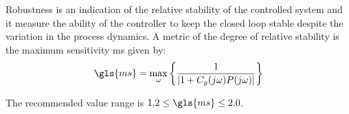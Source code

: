 %
%


Robustness is an indication of the relative stability of the controlled system and it measure the ability of the controller to keep the closed loop stable despite the variation in the process dynamics. A metric of the degree of relative stability is the maximum sensitivity \gls{ms} given by:
%
\begin{equation}  %
\gls{ms}=  \max_\omega \left\{ \frac{1}{\left |{1 + C_y(j\omega ) P(j\omega )}\right |}\right\} 
\label{Ms}
\end{equation}

The recommended value range is  $1.2\leq \gls{ms} \leq 2.0$.
%
